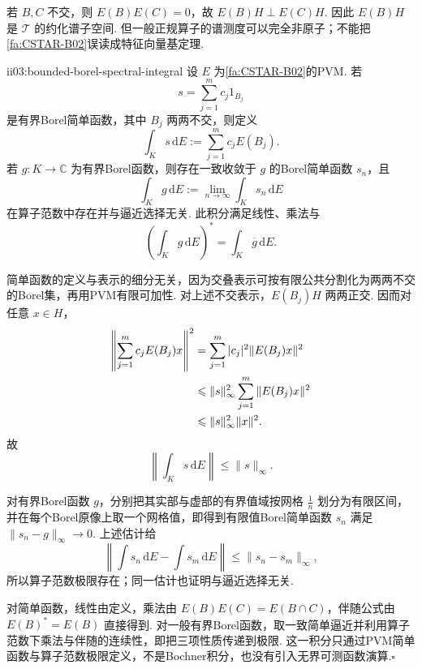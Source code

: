 若 \(\displaystyle B,C\) 不交，则 \(\displaystyle E(B)E(C)=0\)，故
\(\displaystyle E(B)H\perp E(C)H.\)
因此 \(\displaystyle E(B)H\) 是 \(\displaystyle\mathcal T\) 的约化谱子空间. 但一般正规算子的谱测度可以完全非原子；不能把\autoref{fa:CSTAR-B02}误读成特征向量基定理.

\begin{FAProposition}[B][有界Borel谱积分接口]{ii03:bounded-borel-spectral-integral}
设 \(\displaystyle E\) 为\autoref{fa:CSTAR-B02}的PVM. 若
\[
s=\sum_{j=1}^m c_j1_{B_j}
\]
是有界Borel简单函数，其中 \(\displaystyle B_j\) 两两不交，则定义
\[
\int_K s\,\mathrm{d}E
:=\sum_{j=1}^m c_jE(B_j).
\]
若 \(\displaystyle g:K\to\mathbb C\) 为有界Borel函数，则存在一致收敛于 \(\displaystyle g\) 的Borel简单函数 \(\displaystyle s_n\)，且
\[
\int_K g\,\mathrm{d}E
:=\lim_{n\to\infty}\int_K s_n\,\mathrm{d}E
\]
在算子范数中存在并与逼近选择无关. 此积分满足线性、乘法与
\[
\left(\int_K g\,\mathrm{d}E\right)^*
=\int_K\overline g\,\mathrm{d}E.
\]
\end{FAProposition}

\begin{FAProof}
简单函数的定义与表示的细分无关，因为交叠表示可按有限公共分割化为两两不交的Borel集，再用PVM有限可加性. 对上述不交表示，\(\displaystyle E(B_j)H\) 两两正交. 因而对任意 \(\displaystyle x\in H\)，
\[
\begin{aligned}
\displaystyle \left\|\sum_{j=1}^m c_jE(B_j)x\right\|^2 &\displaystyle =\sum_{j=1}^m|c_j|^2\|E(B_j)x\|^2\\
\displaystyle &\displaystyle \leqslant\|s\|_\infty^2\sum_{j=1}^m\|E(B_j)x\|^2\\
\displaystyle &\displaystyle \leqslant\|s\|_\infty^2\|x\|^2.
\end{aligned}
\]
故
\[
\left\|\int_K s\,\mathrm{d}E\right\|\leqslant\|s\|_\infty.
\]

对有界Borel函数 \(\displaystyle g\)，分别把其实部与虚部的有界值域按网格 \(\displaystyle\frac{1}{n}\) 划分为有限区间，并在每个Borel原像上取一个网格值，即得到有限值Borel简单函数 \(\displaystyle s_n\) 满足 \(\displaystyle\|s_n-g\|_\infty\to0\). 上述估计给
\[
\left\|
\int s_n\,\mathrm{d}E-
\int s_m\,\mathrm{d}E
\right\|
\leqslant\|s_n-s_m\|_\infty,
\]
所以算子范数极限存在；同一估计也证明与逼近选择无关.

对简单函数，线性由定义，乘法由 \(\displaystyle E(B)E(C)=E(B\cap C)\)，伴随公式由 \(\displaystyle E(B)^*=E(B)\) 直接得到. 对一般有界Borel函数，取一致简单逼近并利用算子范数下乘法与伴随的连续性，即把三项性质传递到极限. 这一积分只通过PVM简单函数与算子范数极限定义，不是Bochner积分，也没有引入无界可测函数演算.\hfill\(\square\)
\end{FAProof}

